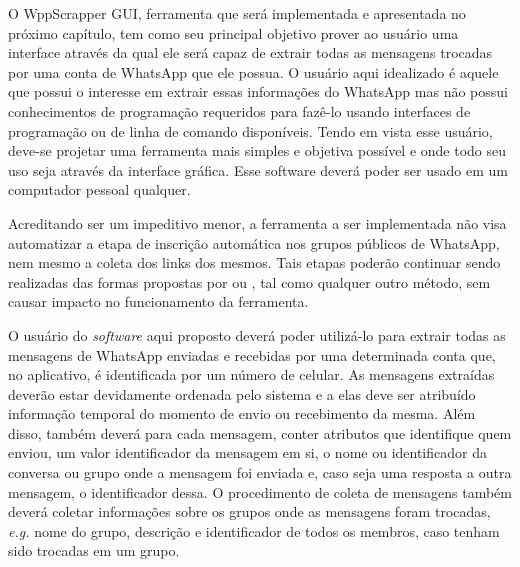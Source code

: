 O WppScrapper GUI, ferramenta que será implementada e apresentada no próximo capítulo, tem como seu principal objetivo prover ao usuário uma interface através da qual ele será capaz de extrair todas as mensagens trocadas por uma conta de WhatsApp que ele possua. O usuário aqui idealizado é aquele que possui o interesse em extrair essas informações do WhatsApp mas não possui conhecimentos de programação requeridos para fazê-lo usando interfaces de programação ou de linha de comando disponíveis. Tendo em vista esse usuário, deve-se projetar uma ferramenta mais simples e objetiva possível e onde todo seu uso seja através da interface gráfica. Esse software deverá poder ser usado em um computador pessoal qualquer. 

Acreditando ser um impeditivo menor, a ferramenta a ser implementada não visa automatizar a etapa de inscrição automática nos grupos públicos de WhatsApp, nem mesmo a coleta dos links dos mesmos. Tais etapas poderão continuar sendo realizadas das formas propostas por  ou , tal como qualquer outro método, sem causar impacto no funcionamento da ferramenta.



O usuário do \textit{software} aqui proposto deverá poder utilizá-lo para extrair todas as mensagens de WhatsApp enviadas e recebidas por uma determinada conta que, no aplicativo, é identificada por um número de celular. As mensagens extraídas deverão estar devidamente ordenada pelo sistema e a elas deve ser atribuído informação temporal do momento de envio ou recebimento da mesma. Além disso, também deverá para cada mensagem, conter atributos que identifique quem enviou, um valor identificador da mensagem em si, o nome ou identificador da conversa ou grupo onde a mensagem foi enviada e, caso seja uma resposta a outra mensagem, o identificador dessa. O procedimento de coleta de mensagens também deverá coletar informações sobre os grupos onde as mensagens foram trocadas, \textit{e.g.} nome do grupo, descrição e identificador de todos os membros, caso tenham sido trocadas em um grupo.

